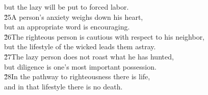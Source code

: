\begin{poetry}
\poemll    but the lazy will be put to forced labor. \\
\poeml \v{25}A person's anxiety weighs down his heart, \\
\poemll    but an appropriate word is encouraging. \\
\poeml \v{26}The righteous person is cautious with respect to his neighbor, \\
\poemll    but the lifestyle of the wicked leads them astray. \\
\poeml \v{27}The lazy person does not roast what he has hunted, \\
\poemll    but diligence is one's most important possession. \\
\poeml \v{28}In the pathway to righteousness there is life, \\
\poemll    and in that lifestyle there is no death.
\end{poetry}

